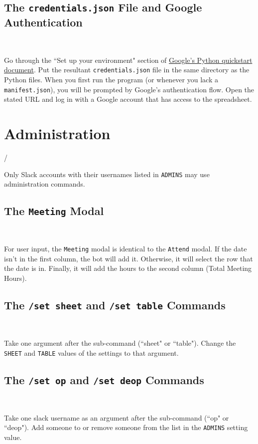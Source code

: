 \documentclass{article}
\begin{document}
\subsection{The \texttt{credentials.json} File and Google Authentication}

\

Go through the ``Set up your environment" section of \href{https://developers.google.com/sheets/api/quickstart/python#set-up-environment}{Google's Python quickstart document}. Put the resultant \texttt{credentials.json} file in the same directory as the Python files. When you first run the program (or whenever you lack a \texttt{manifest.json}), you will be prompted by Google's authentication flow. Open the stated URL and log in with a Google account that has access to the spreadsheet.

\section{Administration}

/

Only Slack accounts with their usernames listed in \texttt{ADMINS} may use administration commands.

\subsection{The \texttt{Meeting} Modal}

\

For user input, the \texttt{Meeting} modal is identical to the \texttt{Attend} modal. If the date isn't in the first column, the bot will add it. Otherwise, it will select the row that the date is in. Finally, it will add the hours to the second column (Total Meeting Hours).

\subsection{The \texttt{/set sheet} and \texttt{/set table} Commands}

\

Take one argument after the sub-command (``sheet" or ``table"). Change the \texttt{SHEET} and \texttt{TABLE} values of the settings to that argument.

\subsection{The \texttt{/set op} and \texttt{/set deop} Commands}

\

Take one slack username as an argument after the sub-command (``op" or ``deop"). Add someone to or remove someone from the list in the \texttt{ADMINS} setting value.
\end{document}
